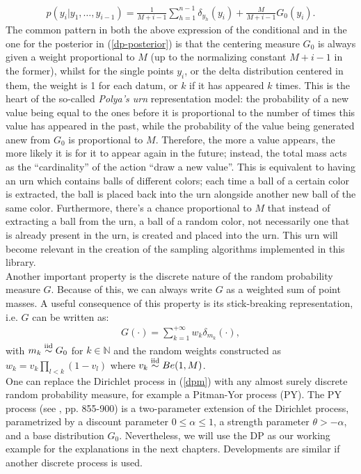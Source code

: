 \begin{equation}
	\begin{aligned}
		p(y_i|y_1,\dots,y_{i-1}) =
		\frac{1}{M+i-1}\sum_{h=1}^{n-1} \delta_{y_h}(y_i) + \frac{M}{M+i-1} G_0(y_i).
	\end{aligned}
\end{equation}
The common pattern in both the above expression of the conditional and in the one for the posterior in (\ref{dp-posterior}) is that the centering measure $G_0$ is always given a weight proportional to $M$ (up to the normalizing constant $M+i-1$ in the former), whilst for the single points $y_i$, or the delta distribution centered in them, the weight is 1 for each datum, or $k$ if it has appeared $k$ times.
This is the heart of the so-called \emph{Polya's urn} representation model: the probability of a new value being equal to the ones before it is proportional to the number of times this value has appeared in the past, while the probability of the value being generated anew from $G_0$ is proportional to $M$.
Therefore, the more a value appears, the more likely it is for it to appear again in the future; instead, the total mass acts as the  ``cardinality'' of the action ``draw a new value''.
This is equivalent to having an urn which contains balls of different colors; each time a ball of a certain color is extracted, the ball is placed back into the urn alongside another new ball of the same color.
Furthermore, there's a chance proportional to $M$ that instead of extracting a ball from the urn, a ball of a random color, not necessarily one that is already present in the urn, is created and placed into the urn.
This urn will become relevant in the creation of the sampling algorithms implemented in this library. 
\\
Another important property is the discrete nature of the random probability measure $G$.
Because of this, we can always write $G$ as a weighted sum of point masses.
A useful consequence of this property is its stick-breaking representation, i.e. $G$ can be written as:
\begin{align*}
	G(\cdot) = \sum_{k=1}^{+\infty} w_k \delta_{m_k} (\cdot),
\end{align*}
with $m_k \stackrel{\text{iid}}{\sim} G_0$ for $k\in\mathbb{N}$ and the random weights constructed as $w_k =v_k\prod\limits_{l<k} (1-v_l)$ where $v_k \stackrel{\text{iid}}{\sim} Be(1,M)$. \\

One can replace the Dirichlet process in (\ref{dpm}) with any almost surely discrete random probability measure, for example a Pitman-Yor process (PY).
The PY process (see \cite{PY}, pp. 855-900) is a two-parameter extension of the Dirichlet process, parametrized by a discount parameter $0 \leq \alpha \leq 1$, a strength parameter $\theta > - \alpha$, and a base distribution $G_0$. 
Nevertheless, we will use the DP as our working example for the explanations in the next chapters. Developments are similar if another discrete process is used.


